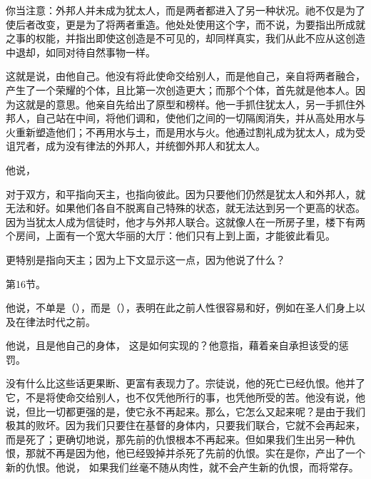 \par

你当注意：外邦人并未成为犹太人，而是两者都进入了另一种状况。祂不仅是为了使后者改变，更是为了将两者重造。他处处使用这个字，而不说，为要指出所成就之事的权能，并指出即使这创造是不可见的，却同样真实，我们从此不应从这创造中退却，如同对待自然事物一样。\par

\par

这就是说，由他自己。他没有将此使命交给别人，而是他自己，亲自将两者融合，产生了一个荣耀的个体，且比第一次创造更大；而那个个体，首先就是他本人。因为这就是的意思。他亲自先给出了原型和榜样。他一手抓住犹太人，另一手抓住外邦人，自己站在中间，将他们调和，使他们之间的一切隔阂消失，并从高处用水与火重新塑造他们；不再用水与土，而是用水与火。他通过割礼成为犹太人，成为受诅咒者，成为没有律法的外邦人，并统御外邦人和犹太人。\par

他说，\par

对于双方，和平指向天主，也指向彼此。因为只要他们仍然是犹太人和外邦人，就无法和好。如果他们各自不脱离自己特殊的状态，就无法达到另一个更高的状态。因为当犹太人成为信徒时，他才与外邦人联合。这就像人在一所房子里，楼下有两个房间，上面有一个宽大华丽的大厅：他们只有上到上面，才能彼此看见。\par

更特别是指向天主；因为上下文显示这一点，因为他说了什么？\par

第16节。 \par

他说，不单是（），而是（），表明在此之前人性很容易和好，例如在圣人们身上以及在律法时代之前。\par

他说，且是他自己的身体， 这是如何实现的？他意指，藉着亲自承担该受的惩罚。\par

\par

没有什么比这些话更果断、更富有表现力了。宗徒说，他的死亡已经仇恨。他并了它，不是将使命交给别人，也不仅凭他所行的事，也凭他所受的苦。他没有说，他说，但比一切都更强的是，使它永不再起来。那么，它怎么又起来呢？是由于我们极其的败坏。因为我们只要住在基督的身体内，只要我们联合，它就不会再起来，而是死了；更确切地说，那先前的仇恨根本不再起来。但如果我们生出另一种仇恨，那就不再是因为他，他已经毁掉并杀死了先前的仇恨。实在是你，产出了一个新的仇恨。他说， 如果我们丝毫不随从肉性，就不会产生新的仇恨，而将常存。\par

